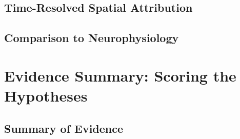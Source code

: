 \subsection{Time-Resolved Spatial Attribution}
\label{subsec:results_timeresolved_attribution}

%
%
%
%
%


\subsection{Comparison to Neurophysiology}
\label{subsec:results_attribution_vs_neuro}

%
%
%
%
%
%


\section{Evidence Summary: Scoring the Hypotheses}
\label{sec:results_hypothesis_scoring}



\subsection{Summary of Evidence}
\label{subsec:results_evidence_summary}

